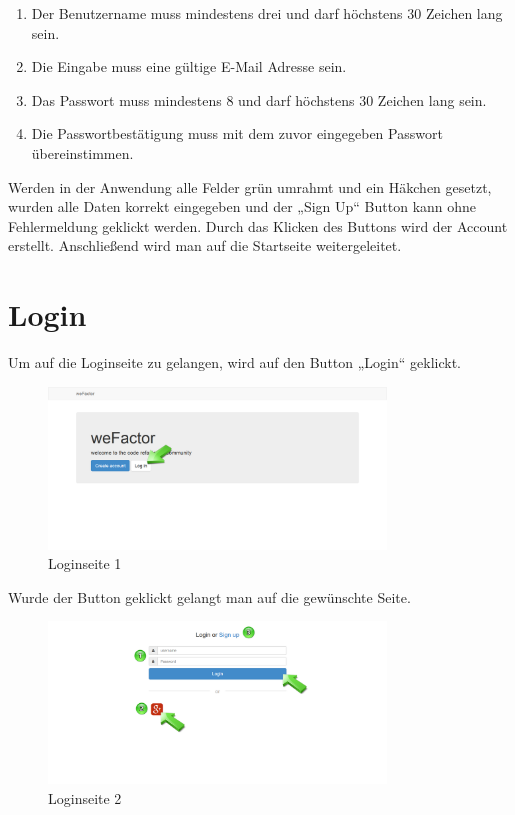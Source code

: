 \begin{enumerate}
\item Der Benutzername muss mindestens drei und darf höchstens 30 Zeichen lang sein.
\item Die Eingabe muss eine gültige E-Mail Adresse sein.
\item Das Passwort muss mindestens 8 und darf höchstens 30 Zeichen lang sein.
\item Die Passwortbestätigung muss mit dem zuvor eingegeben Passwort übereinstimmen.
\end{enumerate}

 
Werden in der Anwendung alle Felder grün umrahmt und ein Häkchen gesetzt, wurden alle Daten korrekt eingegeben und der „Sign Up“ Button kann ohne Fehlermeldung geklickt werden.
Durch das Klicken des Buttons wird der Account erstellt. Anschließend wird man auf die Startseite weitergeleitet.


\chapter{Login}
Um auf die Loginseite zu gelangen, wird auf den Button „Login“ geklickt.

\begin{figure}[H]
    \centering
    \includegraphics[width=0.8\textwidth]{Bilder/3.png}
    \caption{Loginseite 1 }
    \label{fig:loginseite1}
\end{figure}


Wurde der Button geklickt gelangt man auf die gewünschte Seite.

\begin{figure}[H]
    \centering
    \includegraphics[width=0.8\textwidth]{Bilder/8.png}
    \caption{Loginseite 2 }
    \label{fig:loginseite2}
\end{figure}



